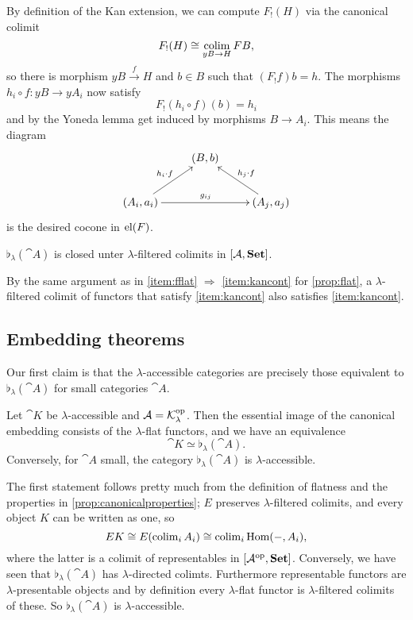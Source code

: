 \begin{Proof}
By definition of the Kan extension, we can compute $F_!(H)$ via the canonical colimit 
\[ F_!(H) \cong \operatorname*{colim}_{yB \to H} FB, \]
so there is morphism $yB \xrightarrow{f} H$ and $b \in B$ such that $(F_!f)b = h$. The morphisms $h_i\circ f : yB \to yA_i$ now satisfy
\[ F_!(h_i \circ f)(b) = h_i \]
and by the Yoneda lemma get induced by morphisms $B \to A_i$. This means the diagram
\[
\xymatrix{
& (B,b) & \\
(A_i,a_i) \ar[ru]^{h_i \circ f} \ar[rr]^{g_{ij}} & & (A_j,a_j) \ar[lu]_{h_j \circ f} 
}\]
is the desired cocone in $\textrm{el}(F)$.
\end{Proof}

\begin{Corollary}
$\flat_\lambda(\cat A)$ is closed unter $\lambda$-filtered colimits in $[\mathcal{A},\mathbf{Set}]$.
\end{Corollary}
\begin{Proof}
By the same argument as in \ref{item:fflat} $\Rightarrow$ \ref{item:kancont} for \ref{prop:flat}, a $\lambda$-filtered colimit of functors that satisfy \ref{item:kancont} also satisfies \ref{item:kancont}.
\end{Proof}

\subsection{Embedding theorems}

Our first claim is that the $\lambda$-accessible categories are precisely those equivalent to $\flat_\lambda(\cat A)$ for small categories $\cat A$.

\begin{Proposition}
Let $\cat K$ be $\lambda$-accessible and $\mathcal{A} = \mathcal{K}^{\textrm{op}}_\lambda$. Then the essential image of the canonical embedding consists of the $\lambda$-flat functors, and we have an equivalence
\[ \cat K \simeq \flat_\lambda(\cat A). \]
Conversely, for $\cat A$ small, the category $\flat_\lambda(\cat A)$ is $\lambda$-accessible.
\end{Proposition}
\begin{Proof}
The first statement follows pretty much from the definition of flatness and the properties in \ref{prop:canonicalproperties}; $E$ preserves $\lambda$-filtered colimits, and every object $K$ can be written as one, so
\[ EK \cong E(\operatorname{colim}_i A_i) \cong \operatorname{colim}_i \textrm{Hom}(-,A_i), \]
where the latter is a colimit of representables in $[\mathcal{A}^{\textrm{op}},\mathbf{Set}]$.
Conversely, we have seen that $\flat_\lambda(\cat A)$ has $\lambda$-directed colimts. Furthermore representable functors are $\lambda$-presentable objects and by definition every $\lambda$-flat functor is $\lambda$-filtered colimits of these. So $\flat_\lambda(\cat A)$ is $\lambda$-accessible.
\end{Proof}


